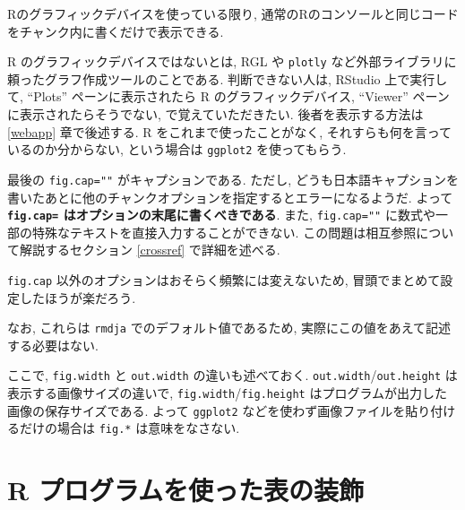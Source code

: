 \documentclass[
]{bxjsbook}
\newenvironment{Shaded}{\begin{snugshade}}{\end{snugshade}}
\newcommand{\AttributeTok}[1]{\textcolor[rgb]{0.77,0.63,0.00}{#1}}
\newcommand{\FloatTok}[1]{\textcolor[rgb]{0.00,0.00,0.81}{#1}}
\newcommand{\FunctionTok}[1]{\textcolor[rgb]{0.00,0.00,0.00}{#1}}
\newcommand{\NormalTok}[1]{#1}
\newcommand{\SpecialCharTok}[1]{\textcolor[rgb]{0.00,0.00,0.00}{#1}}
\newcommand{\StringTok}[1]{\textcolor[rgb]{0.31,0.60,0.02}{#1}}
\theoremstyle{definition}
\theoremstyle{definition}
\theoremstyle{definition}
\theoremstyle{remark}
\begin{document}
Rのグラフィックデバイスを使っている限り,
通常のRのコンソールと同じコードをチャンク内に書くだけで表示できる.

R のグラフィックデバイスではないとは, RGL や \texttt{plotly}
など外部ライブラリに頼ったグラフ作成ツールのことである.
判断できない人は, RStudio 上で実行して, ``Plots'' ペーンに表示されたら R
のグラフィックデバイス, ``Viewer'' ペーンに表示されたらそうでない,
で覚えていただきたい. 後者を表示する方法は \ref{webapp} 章で後述する. R
をこれまで使ったことがなく, それすらも何を言っているのか分からない,
という場合は \texttt{ggplot2} を使ってもらう.

最後の \texttt{fig.cap=""} がキャプションである. ただし,
どうも日本語キャプションを書いたあとに他のチャンクオプションを指定するとエラーになるようだ.
よって \textbf{\texttt{fig.cap=} はオプションの末尾に書くべきである}.
また, \texttt{fig.cap=""}
に数式や一部の特殊なテキストを直接入力することができない.
この問題は相互参照について解説するセクション \ref{crossref}
で詳細を述べる.

\texttt{fig.cap} 以外のオプションはおそらく頻繁には変えないため,
冒頭でまとめて設定したほうが楽だろう.

\begin{Shaded}
\end{Shaded}

なお, これらは \texttt{rmdja} でのデフォルト値であるため,
実際にこの値をあえて記述する必要はない.

ここで, \texttt{fig.width} と \texttt{out.width} の違いも述べておく.
\texttt{out.width}/\texttt{out.height} は表示する画像サイズの違いで,
\texttt{fig.width}/\texttt{fig.height}
はプログラムが出力した画像の保存サイズである. よって \texttt{ggplot2}
などを使わず画像ファイルを貼り付けるだけの場合は \texttt{fig.*}
は意味をなさない.

\hypertarget{r-ux30d7ux30edux30b0ux30e9ux30e0ux3092ux4f7fux3063ux305fux8868ux306eux88c5ux98fe}{%
\section{R
プログラムを使った表の装飾}\label{r-ux30d7ux30edux30b0ux30e9ux30e0ux3092ux4f7fux3063ux305fux8868ux306eux88c5ux98fe}}
\end{document}
